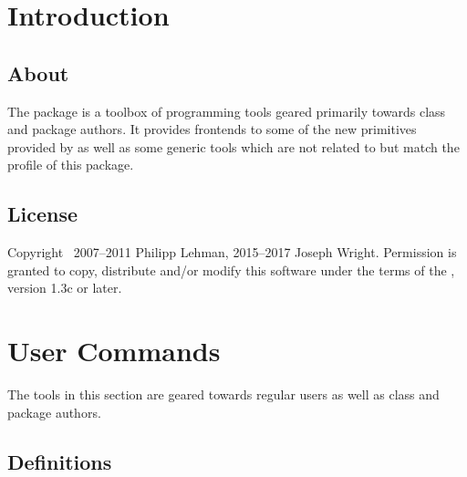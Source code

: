 \documentclass{ltxdockit}[2010/09/26]
\begin{document}
\printtitlepage
\tableofcontents

\section{Introduction}
\label{int}

\subsection[About]{About }

The  package is a toolbox of programming tools geared primarily towards \latex class and package authors. It provides \latex frontends to some of the new primitives provided by \etex as well as some generic tools which are not related to \etex but match the profile of this package.

\subsection{License}

Copyright \textcopyright\ 2007--2011 Philipp Lehman, 2015--2017 Joseph Wright. Permission is granted to copy, distribute and\slash or modify this software under the terms of the \lppl, version 1.3c or later.

\section{User Commands}
\label{use}

The tools in this section are geared towards regular users as well as class and package authors.

\subsection{Definitions}
\label{use:def}
\end{document}
